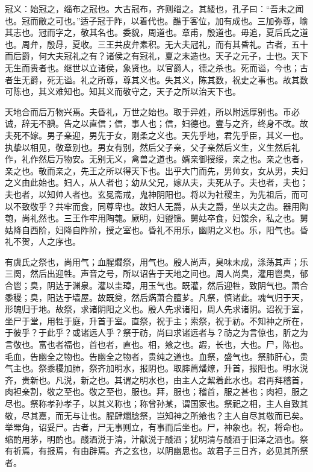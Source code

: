 \documentclass[]{article}
\begin{document}
冠义：始冠之，缁布之冠也。大古冠布，齐则缁之。其緌也，孔子曰：``吾未之闻也。冠而敝之可也。''适子冠于阼，以着代也。醮于客位，加有成也。三加弥尊，喻其志也。冠而字之，敬其名也。委貌，周道也。章甫，殷道也。毋追，夏后氏之道也。周弁，殷冔，夏收。三王共皮弁素积。无大夫冠礼，而有其昏礼。古者，五十而后爵，何大夫冠礼之有？诸侯之有冠礼，夏之末造也。天子之元子，士也。天下无生而贵者也。继世以立诸侯，象贤也。以官爵人，德之杀也。死而谥，今也；古者生无爵，死无谥。礼之所尊，尊其义也。失其义，陈其数，祝史之事也。故其数可陈也，其义难知也。知其义而敬守之，天子之所以治天下也。

天地合而后万物兴焉。夫昏礼，万世之始也。取于异姓，所以附远厚别也。币必诚，辞无不腆。告之以直信；信，事人也；信，妇德也。壹与之齐，终身不改。故夫死不嫁。男子亲迎，男先于女，刚柔之义也。天先乎地，君先乎臣，其义一也。执挚以相见，敬章别也。男女有别，然后父子亲，父子亲然后义生，义生然后礼作，礼作然后万物安。无别无义，禽兽之道也。婿亲御授绥，亲之也。亲之也者，亲之也。敬而亲之，先王之所以得天下也。出乎大门而先，男帅女，女从男，夫妇之义由此始也。妇人，从人者也；幼从父兄，嫁从夫，夫死从子。夫也者，夫也；夫也者，以知帅人者也。玄冕斋戒，鬼神阴阳也。将以为社稷主，为先祖后，而可以不致敬乎？共牢而食，同尊卑也。故妇人无爵，从夫之爵，坐以夫之齿。器用陶匏，尚礼然也。三王作牢用陶匏。厥明，妇盥馈。舅姑卒食，妇馂余，私之也。舅姑降自西阶，妇降自阼阶，授之室也。昏礼不用乐，幽阴之义也。乐，阳气也。昏礼不贺，人之序也。

有虞氏之祭也，尚用气；血腥爓祭，用气也。殷人尚声，臭味未成，涤荡其声；乐三阕，然后出迎牲。声音之号，所以诏告于天地之间也。周人尚臭，灌用鬯臭，郁合鬯；臭，阴达于渊泉。灌以圭璋，用玉气也。既灌，然后迎牲，致阴气也。萧合黍稷；臭，阳达于墙屋。故既奠，然后焫萧合膻芗。凡祭，慎诸此。魂气归于天，形魄归于地。故祭，求诸阴阳之义也。殷人先求诸阳，周人先求诸阴。诏祝于室，坐尸于堂，用牲于庭，升首于室。直祭，祝于主；索祭，祝于祊。不知神之所在，于彼乎？于此乎？或诸远人乎？祭于祊，尚曰求诸远者与？祊之为言倞也，肵之为言敬也。富也者福也，首也者，直也。相，飨之也。嘏，长也，大也。尸，陈也。毛血，告幽全之物也。告幽全之物者，贵纯之道也。血祭，盛气也。祭肺肝心，贵气主也。祭黍稷加肺，祭齐加明水，报阴也。取膟菺燔燎，升首，报阳也。明水涚齐，贵新也。凡涚，新之也。其谓之明水也，由主人之絜着此水也。君再拜稽首，肉袒亲割，敬之至也。敬之至也，服也。拜，服也；稽首，服之甚也；肉袒，服之尽也。祭称孝孙孝子，以其义称也；称曾孙某，谓国家也。祭祀之相，主人自致其敬，尽其嘉，而无与让也。腥肆爓腍祭，岂知神之所飨也？主人自尽其敬而已矣。举斝角，诏妥尸。古者，尸无事则立，有事而后坐也。尸，神象也。祝，将命也。缩酌用茅，明酌也。醆酒涚于清，汁献涚于醆酒；犹明清与醆酒于旧泽之酒也。祭有祈焉，有报焉，有由辟焉。齐之玄也，以阴幽思也。故君子三日齐，必见其所祭者。
\end{document}
